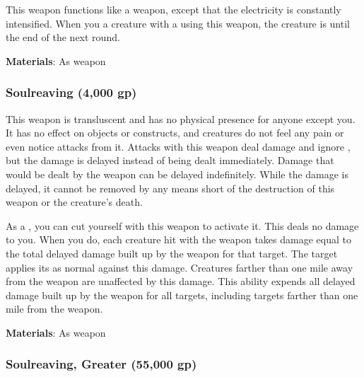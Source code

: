 This weapon functions like a  weapon, except that the electricity is constantly intensified.
When you  a creature with a  using this weapon,
the creature is \dazed until the end of the next round.



\vspace{0.25em}
\textbf{Materials}: As weapon


\lowercase{\hypertarget{item:Soulreaving}{}}\label{item:Soulreaving}
\hypertarget{item:Soulreaving}{\subsubsection{Soulreaving\hfill{} (4,000 gp)}}

This weapon is transluscent and has no physical presence for anyone except you.
It has no effect on objects or constructs, and creatures do not feel any pain or even notice attacks from it.
Attacks with this weapon deal  damage and ignore , but the damage is delayed instead of being dealt immediately.
Damage that would be dealt by the weapon can be delayed indefinitely.
While the damage is delayed, it cannot be removed by any means short of the destruction of this weapon or the creature's death.

As a , you can cut yourself with this weapon to activate it.
This deals no damage to you.
When you do, each creature hit with the weapon takes  damage equal to the total delayed damage built up by the weapon for that target.
The target applies its  as normal against this damage.
Creatures farther than one mile away from the weapon are unaffected by this damage.
This ability expends all delayed damage built up by the weapon for all targets, including targets farther than one mile from the weapon.



\vspace{0.25em}
\textbf{Materials}: As weapon


\lowercase{\hypertarget{item:Soulreaving, Greater}{}}\label{item:Soulreaving, Greater}
\hypertarget{item:Soulreaving, Greater}{\subsubsection{Soulreaving, Greater\hfill{} (55,000 gp)}}

